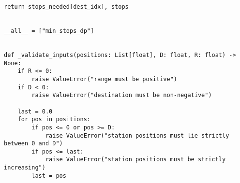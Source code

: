 \begin{lstlisting}[caption={Dynamic programming baseline for validation},label={lst:ev-naive}]
    return stops_needed[dest_idx], stops


__all__ = ["min_stops_dp"]


def _validate_inputs(positions: List[float], D: float, R: float) -> None:
    if R <= 0:
        raise ValueError("range must be positive")
    if D < 0:
        raise ValueError("destination must be non-negative")

    last = 0.0
    for pos in positions:
        if pos <= 0 or pos >= D:
            raise ValueError("station positions must lie strictly between 0 and D")
        if pos <= last:
            raise ValueError("station positions must be strictly increasing")
        last = pos
\end{lstlisting}
